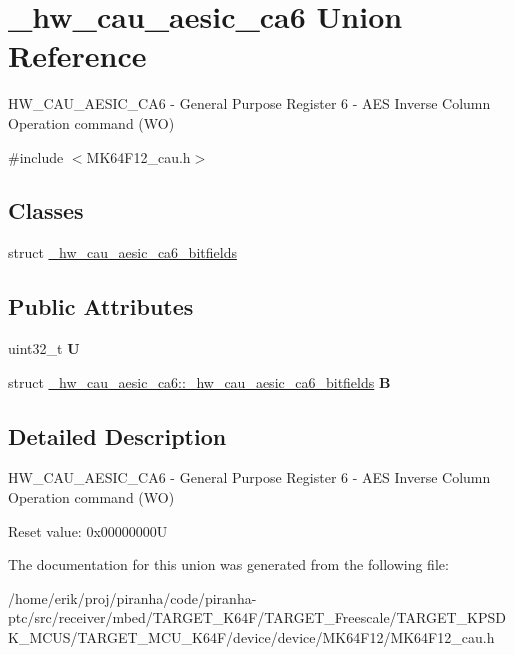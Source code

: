 \hypertarget{union__hw__cau__aesic__ca6}{}\section{\+\_\+hw\+\_\+cau\+\_\+aesic\+\_\+ca6 Union Reference}
\label{union__hw__cau__aesic__ca6}


H\+W\+\_\+\+C\+A\+U\+\_\+\+A\+E\+S\+I\+C\+\_\+\+C\+A6 -\/ General Purpose Register 6 -\/ A\+ES Inverse Column Operation command (WO)  




{\ttfamily \#include $<$M\+K64\+F12\+\_\+cau.\+h$>$}

\subsection*{Classes}
\begin{DoxyCompactItemize}
\item 
struct \hyperlink{struct__hw__cau__aesic__ca6_1_1__hw__cau__aesic__ca6__bitfields}{\+\_\+hw\+\_\+cau\+\_\+aesic\+\_\+ca6\+\_\+bitfields}
\end{DoxyCompactItemize}
\subsection*{Public Attributes}
\begin{DoxyCompactItemize}
\item 
uint32\+\_\+t {\bfseries U}\hypertarget{union__hw__cau__aesic__ca6_adeb837fb9fcd5ec9f0577f53d463d12a}{}\label{union__hw__cau__aesic__ca6_adeb837fb9fcd5ec9f0577f53d463d12a}

\item 
struct \hyperlink{struct__hw__cau__aesic__ca6_1_1__hw__cau__aesic__ca6__bitfields}{\+\_\+hw\+\_\+cau\+\_\+aesic\+\_\+ca6\+::\+\_\+hw\+\_\+cau\+\_\+aesic\+\_\+ca6\+\_\+bitfields} {\bfseries B}\hypertarget{union__hw__cau__aesic__ca6_ac16e30131803d3fe4631807d35330db9}{}\label{union__hw__cau__aesic__ca6_ac16e30131803d3fe4631807d35330db9}

\end{DoxyCompactItemize}


\subsection{Detailed Description}
H\+W\+\_\+\+C\+A\+U\+\_\+\+A\+E\+S\+I\+C\+\_\+\+C\+A6 -\/ General Purpose Register 6 -\/ A\+ES Inverse Column Operation command (WO) 

Reset value\+: 0x00000000U 

The documentation for this union was generated from the following file\+:\begin{DoxyCompactItemize}
\item 
/home/erik/proj/piranha/code/piranha-\/ptc/src/receiver/mbed/\+T\+A\+R\+G\+E\+T\+\_\+\+K64\+F/\+T\+A\+R\+G\+E\+T\+\_\+\+Freescale/\+T\+A\+R\+G\+E\+T\+\_\+\+K\+P\+S\+D\+K\+\_\+\+M\+C\+U\+S/\+T\+A\+R\+G\+E\+T\+\_\+\+M\+C\+U\+\_\+\+K64\+F/device/device/\+M\+K64\+F12/M\+K64\+F12\+\_\+cau.\+h\end{DoxyCompactItemize}
